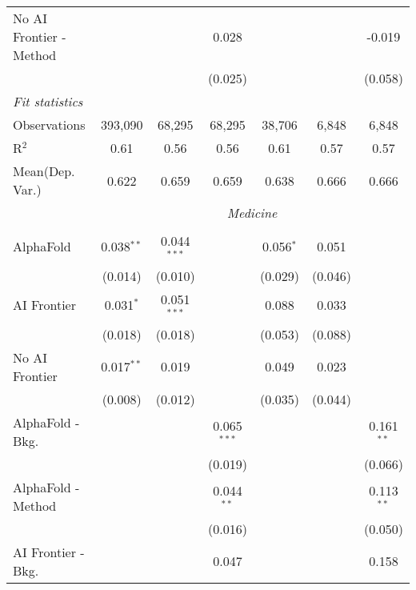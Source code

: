 \begin{tabular}{lcccccc}
   No AI Frontier - Method &               &               & 0.028         &               &             & -0.019\\   
                           &               &               & (0.025)       &               &             & (0.058)\\   
   \midrule
   \emph{Fit statistics}\\
   Observations            & 393,090       & 68,295        & 68,295        & 38,706        & 6,848       & 6,848\\  
   R$^2$                   & 0.61          & 0.56          & 0.56          & 0.61          & 0.57        & 0.57\\  
   
Mean(Dep. Var.) & 0.622 & 0.659 & 0.659 & 0.638 & 0.666 & 0.666 \\
 & \multicolumn{6}{c}{\textit{Medicine}} \\ \\
   AlphaFold               & 0.038$^{**}$ & 0.044$^{***}$ &               & 0.056$^{*}$ & 0.051   &   \\   
                           & (0.014)      & (0.010)       &               & (0.029)     & (0.046) &   \\   
   AI Frontier             & 0.031$^{*}$  & 0.051$^{***}$ &               & 0.088       & 0.033   &   \\   
                           & (0.018)      & (0.018)       &               & (0.053)     & (0.088) &   \\   
   No AI Frontier          & 0.017$^{**}$ & 0.019         &               & 0.049       & 0.023   &   \\   
                           & (0.008)      & (0.012)       &               & (0.035)     & (0.044) &   \\   
   AlphaFold - Bkg.        &              &               & 0.065$^{***}$ &             &         & 0.161$^{**}$\\   
                           &              &               & (0.019)       &             &         & (0.066)\\   
   AlphaFold - Method      &              &               & 0.044$^{**}$  &             &         & 0.113$^{**}$\\   
                           &              &               & (0.016)       &             &         & (0.050)\\   
   AI Frontier - Bkg.      &              &               & 0.047         &             &         & 0.158\\   

\end{tabular}
